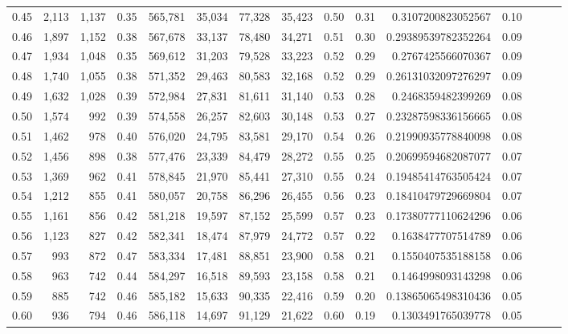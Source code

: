 \begin{tabular}{rrrrrrrrrrrrrrr}
0.45 &   2,113 &  1,137 &  0.35 &  565,781 &   35,034 &   77,328 &   35,423 &  0.50 &  0.31 &    0.3107200823052567 &      0.10 \\
0.46 &   1,897 &  1,152 &  0.38 &  567,678 &   33,137 &   78,480 &   34,271 &  0.51 &  0.30 &   0.29389539782352264 &      0.09 \\
0.47 &   1,934 &  1,048 &  0.35 &  569,612 &   31,203 &   79,528 &   33,223 &  0.52 &  0.29 &    0.2767425566070367 &      0.09 \\
0.48 &   1,740 &  1,055 &  0.38 &  571,352 &   29,463 &   80,583 &   32,168 &  0.52 &  0.29 &   0.26131032097276297 &      0.09 \\
0.49 &   1,632 &  1,028 &  0.39 &  572,984 &   27,831 &   81,611 &   31,140 &  0.53 &  0.28 &    0.2468359482399269 &      0.08 \\
0.50 &   1,574 &    992 &  0.39 &  574,558 &   26,257 &   82,603 &   30,148 &  0.53 &  0.27 &   0.23287598336156665 &      0.08 \\
0.51 &   1,462 &    978 &  0.40 &  576,020 &   24,795 &   83,581 &   29,170 &  0.54 &  0.26 &   0.21990935778840098 &      0.08 \\
0.52 &   1,456 &    898 &  0.38 &  577,476 &   23,339 &   84,479 &   28,272 &  0.55 &  0.25 &   0.20699594682087077 &      0.07 \\
0.53 &   1,369 &    962 &  0.41 &  578,845 &   21,970 &   85,441 &   27,310 &  0.55 &  0.24 &   0.19485414763505424 &      0.07 \\
0.54 &   1,212 &    855 &  0.41 &  580,057 &   20,758 &   86,296 &   26,455 &  0.56 &  0.23 &   0.18410479729669804 &      0.07 \\
0.55 &   1,161 &    856 &  0.42 &  581,218 &   19,597 &   87,152 &   25,599 &  0.57 &  0.23 &   0.17380777110624296 &      0.06 \\
0.56 &   1,123 &    827 &  0.42 &  582,341 &   18,474 &   87,979 &   24,772 &  0.57 &  0.22 &    0.1638477707514789 &      0.06 \\
0.57 &     993 &    872 &  0.47 &  583,334 &   17,481 &   88,851 &   23,900 &  0.58 &  0.21 &    0.1550407535188158 &      0.06 \\
0.58 &     963 &    742 &  0.44 &  584,297 &   16,518 &   89,593 &   23,158 &  0.58 &  0.21 &    0.1464998093143298 &      0.06 \\
0.59 &     885 &    742 &  0.46 &  585,182 &   15,633 &   90,335 &   22,416 &  0.59 &  0.20 &   0.13865065498310436 &      0.05 \\
0.60 &     936 &    794 &  0.46 &  586,118 &   14,697 &   91,129 &   21,622 &  0.60 &  0.19 &    0.1303491765039778 &      0.05 \\

\end{tabular}
